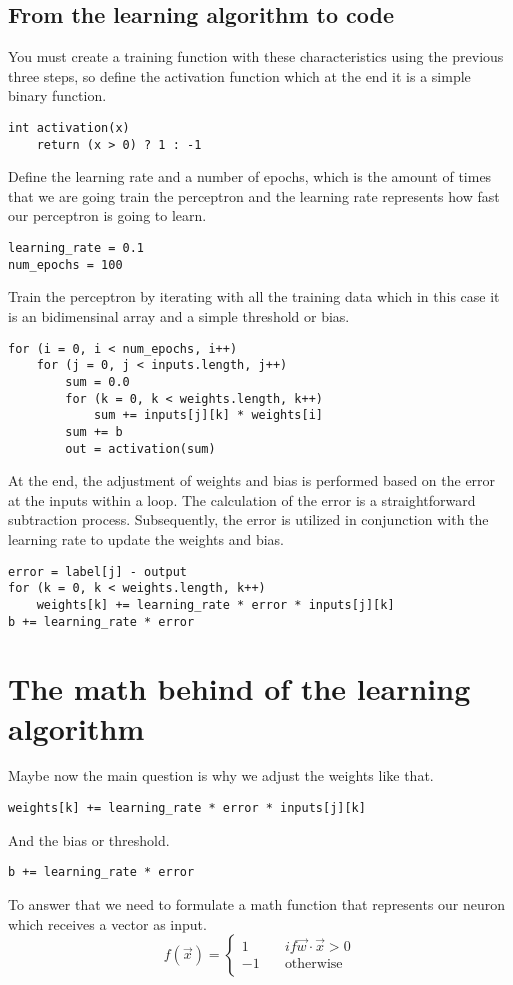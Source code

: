 \subsection{From the learning algorithm to code}
You must create a training function with these characteristics using the previous three steps,
so define the activation function which at the end it is a simple binary function.
\begin{verbatim}
int activation(x)
    return (x > 0) ? 1 : -1
\end{verbatim}
Define the learning rate and a number of epochs, which is the amount of times that we are going
train the perceptron and the learning rate represents how fast our perceptron is going to learn.
\begin{verbatim}
learning_rate = 0.1
num_epochs = 100
\end{verbatim}
Train the perceptron by iterating with all the training data which in this case it is an bidimensinal
array and a simple threshold or bias.
\begin{verbatim}
for (i = 0, i < num_epochs, i++)
    for (j = 0, j < inputs.length, j++)
        sum = 0.0
        for (k = 0, k < weights.length, k++)
            sum += inputs[j][k] * weights[i]
        sum += b
        out = activation(sum)
\end{verbatim}
At the end, the adjustment of weights and bias is performed based on the error at the inputs within a loop.
The calculation of the error is a straightforward subtraction process. Subsequently, the error is utilized in
conjunction with the learning rate to update the weights and bias.
\begin{verbatim}
error = label[j] - output
for (k = 0, k < weights.length, k++)
    weights[k] += learning_rate * error * inputs[j][k]
b += learning_rate * error
\end{verbatim}
\section{The math behind of the learning algorithm}
Maybe now the main question is why we adjust the weights like that.
\begin{verbatim}
weights[k] += learning_rate * error * inputs[j][k]
\end{verbatim}
And the bias or threshold.
\begin{verbatim}
b += learning_rate * error
\end{verbatim}
To answer that we need to formulate a math function that represents our neuron which receives a vector
as input.
\[
  f(\vec{x}) = 
  \begin{cases}
    1 &\quad if \vec{w} \cdot \vec{x} > 0  \\
    -1 &\quad \text{otherwise} \\
  \end{cases}
\]

